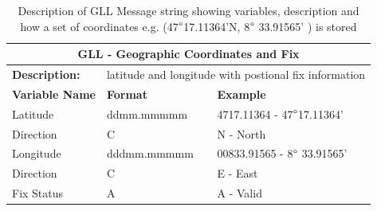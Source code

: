 \begin{table}[H]
    \centering
    \caption{Description of GLL Message string showing variables, description and how a set of coordinates e.g. (47$\degree$17.11364'N,  8$\degree$ 33.91565' ) is stored}
    \begin{tabular}{|l|l|l|}
    \hline
     \multicolumn{3}{|c|}{\textbf{GLL - Geographic Coordinates and Fix}}\\
     \hline
    \textbf{Description:} & \multicolumn{2}{l|}{ latitude and longitude with postional fix information}\\
     \hline
     \textbf{Variable Name} & \textbf{Format}& \textbf{Example} \\
     \hline
     Latitude & ddmm.mmmmm & 4717.11364 - 47$\degree$17.11364'\\
      \hline
     Direction  & C & N - North \\
      \hline
      Longitude &dddmm.mmmmm & 00833.91565 - 8$\degree$ 33.91565' \\
      \hline
      Direction & C & E - East \\
      \hline
      Fix Status & A & A - Valid\\
      \hline
    \end{tabular}

    \label{tab:NMEA_GLL}
\end{table}

